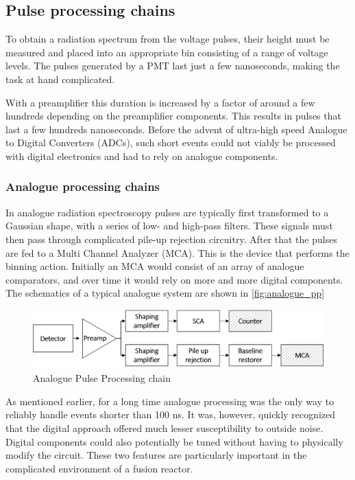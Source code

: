 \subsection{Pulse processing chains}

To obtain a radiation spectrum from the voltage pulses,
their height must be measured and
placed into an appropriate bin consisting of a range of voltage levels.
The pulses generated by a PMT last just a few nanoseconds,
making the task at hand complicated.


With a preamplifier this duration is increased by a factor of around
a few hundreds depending on the preamplifier components.
This results in pulses that last a few hundreds nanoseconds.
Before the advent of ultra-high speed Analogue to Digital Converters (ADCs),
such short events could not viably be processed with digital 
electronics and had to rely on analogue components.

\subsubsection{Analogue processing chains}

In analogue radiation spectroscopy
pulses are typically first transformed to a Gaussian shape,
with a series of low- and high-pass filters.
These signals must then pass through complicated pile-up
rejection circuitry. After that the pulses 
are fed to a Multi Channel Analyzer (MCA).
This is the device that performs the binning action.
Initially an MCA would consist of an array of 
analogue comparators, and over time it would rely 
on more and more digital components.
The schematics of a typical analogue system are shown in \autoref{fig:analogue_pp}
\begin{figure}[h]
  \centering
  \includegraphics[width=\linewidth]{media/analog_pulse_processing.png}
  \caption{Analogue Pulse Processing chain}
  \label{fig:analogue_pp}
\end{figure}



As mentioned earlier, for a long time analogue processing 
was the only way to reliably handle events shorter than 100 ns. 
It was, however, quickly recognized
that the digital approach offered 
much lesser susceptibility to outside noise. 
Digital components could also potentially be tuned without
having to physically modify the circuit.
These two features are particularly important in the 
complicated environment of a fusion reactor.
\cite{analog_vs_digital_1998}

